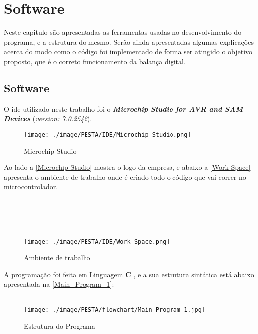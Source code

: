 \chapter{Software}
Neste capitulo são apresentadas as ferramentas usadas no desenvolvimento do programa, e a estrutura do mesmo. Serão ainda apresentadas algumas explicações acerca do modo como o código foi implementado de forma ser atingido o objetivo proposto, que é o correto funcionamento da balança digital.
\section{Software}
O \ac{ide} utilizado neste trabalho foi o \textbf{\textit{{Microchip Studio for AVR\textsuperscript{\textregistered} and SAM Devices}}} (\textit{version: 7.0.2542}).
\\
\begin{minipage}[!b]{.55\linewidth}
	\begin{figure}[H]
		\captionsetup{justification=raggedright,singlelinecheck=false}
		\texttt{[image: ./image/PESTA/IDE/Microchip-Studio.png]}
		\caption{Microchip Studio}
		\label{Microchip-Studio}
	\end{figure}
\end{minipage}
\begin{minipage}[!b]{.45\linewidth}
	Ao lado a \autoref{Microchip-Studio} mostra o logo da empresa, e abaixo a \autoref{Work-Space} apresenta o ambiente de trabalho onde é criado todo o código que vai correr no microcontrolador.
	\\
	\\
	\\
	\\
	\\
\end{minipage}
\begin{figure}[H]
	\centering
	\texttt{[image: ./image/PESTA/IDE/Work-Space.png]}
	\caption{Ambiente de trabalho}
	\label{Work-Space}
\end{figure}
A programação foi feita em Linguagem \textbf{C} \cite{book-11}, e a sua estrutura sintática está abaixo apresentada na \autoref{Main_Program_1}:
\\
\\
\begin{figure}[H]
	\centering
	\texttt{[image: ./image/PESTA/flowchart/Main-Program-1.jpg]}
	\caption{Estrutura do Programa}
	\label{Main_Program_1}
\end{figure}
